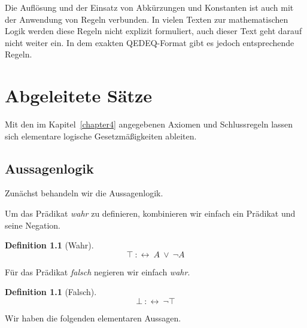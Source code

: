 \documentclass[a4paper,german,10pt,twoside]{book}
\theoremstyle{definition}
\newtheorem{defn}[thm]{Definition}
\theoremstyle{remark}
\begin{document}
Die Aufl{\"o}sung und der Einsatz von Abk{\"u}rzungen und Konstanten ist auch mit der Anwendung von Regeln verbunden. In vielen Texten zur mathematischen Logik werden diese Regeln nicht explizit formuliert, auch dieser Text geht darauf nicht weiter ein. In dem exakten QEDEQ-Format gibt es jedoch entsprechende Regeln.




\chapter{Abgeleitete S{\"a}tze} \label{chapter5} \hypertarget{chapter5}{}

Mit den im Kapitel~\ref{chapter4} angegebenen Axiomen und Schlussregeln lassen sich elementare logische Gesetzm{\"a}{\ss}igkeiten ableiten.

\section{Aussagenlogik} \label{chapter5_section0} \hypertarget{chapter5_section0}{}
Zun{\"a}chst behandeln wir die Aussagenlogik.

\par
Um das Pr{\"a}dikat \emph{wahr} zu definieren, kombinieren wir einfach ein Pr{\"a}dikat und seine Negation.

\begin{defn}[Wahr]
\label{definition:True} \hypertarget{definition:True}{}
$$\top\ :\leftrightarrow \ A\ \lor \ \neg A$$

\end{defn}




\par
F{\"u}r das Pr{\"a}dikat \emph{falsch} negieren wir einfach \emph{wahr}.

\begin{defn}[Falsch]
\label{definition:False} \hypertarget{definition:False}{}
$$\bot\ :\leftrightarrow \ \neg \top$$

\end{defn}




\par
Wir haben die folgenden elementaren Aussagen.
\end{document}
